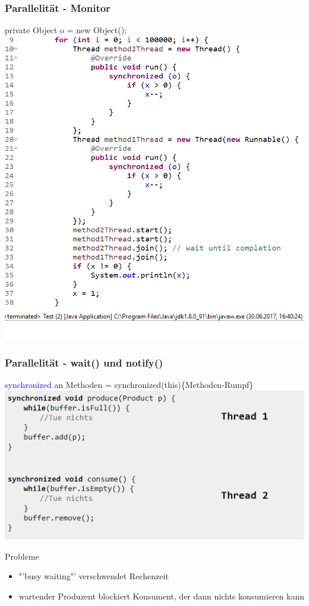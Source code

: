 \documentclass[18pt]{beamer}
\begin{document}
	\begin{frame}
		\frametitle{Parallelität - Monitor}
		private Object o = new Object();
		\includegraphics[scale=0.36]{./pics/tut5/synch-ex3.png} \pause
		\includegraphics[scale=0.39]{./pics/tut5/synch-ex4.png}
	\end{frame}

	\begin{frame}
		\frametitle{Parallelität - wait() und notify()}
		\textcolor{blue}{synchronized} an Methoden = synchronized(this)\{Methoden-Rumpf\} \pause
		\includegraphics[scale=0.3]{./pics/tut5/cons-prod.png}
		\begin{alertblock}{Probleme}
			\begin{itemize}
				\pause
				\item "'busy waiting"' verschwendet Rechenzeit \pause
				\item wartender Produzent blockiert Konsument, der dann nichts konsumieren kann 
			\end{itemize}
		\end{alertblock}
	\end{frame}
\end{document}
